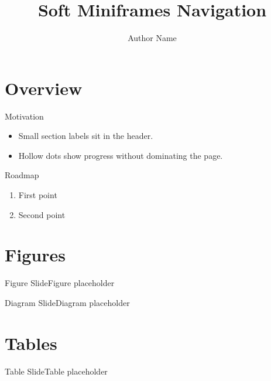 ﻿\documentclass[10pt]{beamer}
\title{Soft Miniframes Navigation}
\author{Author Name}
\date{}
\begin{document}
\begin{frame}[plain]\titlepage\end{frame}

\section{Overview}
\begin{frame}{Motivation}
\begin{itemize}
  \item Small section labels sit in the header.
  \item Hollow dots show progress without dominating the page.
\end{itemize}
\end{frame}
\begin{frame}{Roadmap}
\begin{enumerate}
  \item First point
  \item Second point
\end{enumerate}
\end{frame}

\section{Figures}
\begin{frame}{Figure Slide}\centering Figure placeholder\end{frame}
\begin{frame}{Diagram Slide}\centering Diagram placeholder\end{frame}

\section{Tables}
\begin{frame}{Table Slide}\centering Table placeholder\end{frame}
\end{document}
